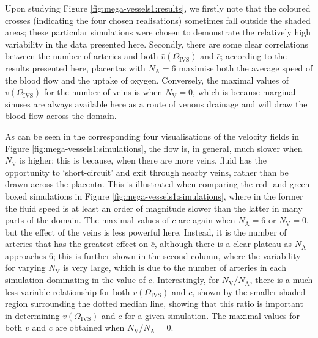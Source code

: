             Upon studying Figure \ref{fig:mega-vessels1:results}, we firstly note that the coloured crosses (indicating the four chosen realisations) sometimes fall outside the shaded areas; these particular simulations were chosen to demonstrate the relatively high variability in the data presented here. Secondly, there are some clear correlations between the number of arteries and both $\bar{v}(\Omega_\text{IVS})$ and $\bar{c}$; according to the results presented here, placentas with $N_\text{A} = 6$ maximise both the average speed of the blood flow and the uptake of oxygen. Conversely, the maximal values of $\bar{v}(\Omega_\text{IVS})$ for the number of veins is when $N_\text{V} = 0$, which is because marginal sinuses are always available here as a route of venous drainage and will draw the blood flow across the domain.
            
            As can be seen in the corresponding four visualisations of the velocity fields in Figure \ref{fig:mega-vessels1:simulations}, the flow is, in general, much slower when $N_\text{V}$ is higher; this is because, when there are more veins, fluid has the opportunity to `short-circuit' and exit through nearby veins, rather than be drawn across the placenta. This is illustrated when comparing the red- and green-boxed simulations in Figure \ref{fig:mega-vessels1:simulations}, where in the former the fluid speed is at least an order of magnitude slower than the latter in many parts of the domain. The maximal values of $\bar{c}$ are again when $N_\text{A} = 6$ or $N_\text{V} = 0$, but the effect of the veins is less powerful here. Instead, it is the number of arteries that has the greatest effect on $\bar{c}$, although there is a clear plateau as $N_\text{A}$ approaches $6$; this is further shown in the second column, where the variability for varying $N_\text{V}$ is very large, which is due to the number of arteries in each simulation dominating in the value of $\bar{c}$. Interestingly, for $N_\text{V}/N_\text{A}$, there is a much less variable relationship for both $\bar{v}(\Omega_\text{IVS})$ and $\bar{c}$, shown by the smaller shaded region surrounding the dotted median line, showing that this ratio is important in determining $\bar{v}(\Omega_\text{IVS})$ and $\bar{c}$ for a given simulation. The maximal values for both $\bar{v}$ and $\bar{c}$ are obtained when $N_\text{V}/N_\text{A} = 0$.
            
